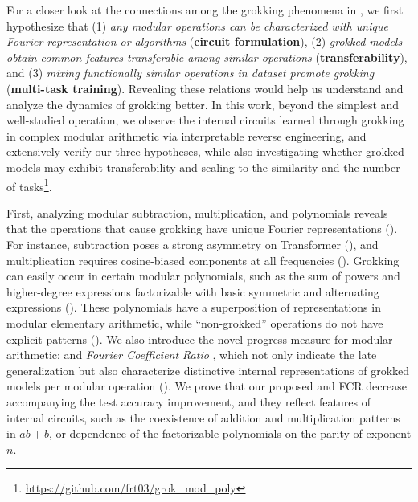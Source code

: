 \documentclass[10pt]{article} %
\newcommand{\update}[1]{{\color{black}{#1}}}
\begin{document}
For a closer look at the connections among the grokking phenomena in \update{other modular operations}, we first hypothesize that (1) \textit{any modular operations can be characterized with unique Fourier representation or algorithms} (\textbf{circuit formulation}), (2) \textit{grokked models obtain common features transferable among similar operations} (\textbf{transferability}), and (3) \textit{mixing functionally similar operations in dataset promote grokking} (\textbf{multi-task training}).
Revealing these relations would help us understand and analyze the dynamics of grokking better.
In this work, beyond the simplest and well-studied operation, we observe the internal circuits learned through grokking in complex modular arithmetic via interpretable reverse engineering, and extensively verify our three hypotheses, while also investigating whether grokked models may exhibit transferability \update{among the models grokked with other operations} and scaling to the similarity and the number of tasks\footnote{\url{https://github.com/frt03/grok_mod_poly}}.

First, analyzing modular subtraction, multiplication, and polynomials reveals that the operations that cause grokking have unique Fourier representations ().
For instance, subtraction poses a strong asymmetry on Transformer (), and multiplication requires cosine-biased components at all frequencies (). 
Grokking can easily occur in certain modular polynomials, such as the sum of powers and higher-degree expressions factorizable with basic symmetric and alternating expressions ().
These polynomials have a superposition of representations in modular elementary arithmetic, while ``non-grokked'' operations do not have explicit patterns ().
We also introduce the novel progress measure for modular arithmetic; \textit{\update{Fourier Frequency Density (FFD)}} and \textit{Fourier Coefficient Ratio \update{(FCR)}}, which not only indicate the late generalization but also characterize distinctive internal representations of grokked models per modular operation ().
We prove that our proposed \update{FFD} and FCR decrease accompanying the test accuracy improvement, and they reflect features of internal circuits, such as the coexistence of addition and multiplication patterns in $ab+b$, or dependence of the factorizable polynomials on the parity of exponent $n$.
\end{document}
